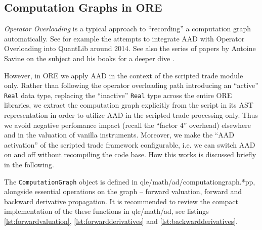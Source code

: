 \documentclass[12pt, a4paper]{report}
\begin{document}
\subsection{Computation Graphs in ORE}

{\em Operator Overloading} is a typical approach to ``recording'' a computation graph automatically.
See for example the attempts to integrate AAD with Operator Overloading into QuantLib \cite{QuantLib}
around 2014. See also the series of papers by Antoine Savine on the subject \cite{savine_cg_1,
  savine_cg_2, savine_cg_3} and his books for a deeper dive \cite{savine_book_1, savine_book_2}.

However, in ORE we apply AAD in the context of the scripted trade module only. Rather than following
the operator overloading path introducing an ``active'' {\tt Real} data type, replacing the
``inactive'' {\tt Real} type across the entire ORE libraries, we extract the computation graph
explicitly from the script in its AST representation in order to utilize AAD in the scripted trade
processing only. Thus we avoid negative perfomance impact (recall the ``factor 4'' overhead)
elsewhere and in the valuation of vanilla instruments. Moreover, we make the ``AAD activation'' of the
scripted trade framework configurable, i.e. we can switch AAD on and off without recompiling the
code base. How this works is discussed briefly in the following.

The {\tt ComputationGraph} object is defined in qle/math/ad/computationgraph.*pp, alongside
essential operations on the graph -- forward valuation, forward and backward derivative propagation.
It is recommended to review the compact implementation of the these functions in qle/math/ad,
see listings \ref{lst:forwardvaluation}, \ref{lst:forwardderivatives} and \ref{lst:backwardderivatives}.
\end{document}

